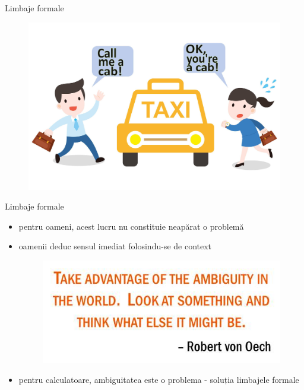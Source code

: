 \documentclass[pdf]{beamer}
\begin{document}
\begin{frame}{Limbaje formale}
\begin{figure}[ht!]
\centering
\includegraphics[scale=0.1]{img/callmeacab.jpg}
\end{figure}
\end{frame}



\begin{frame}{Limbaje formale}
\begin{itemize}
\item
pentru oameni, acest lucru nu constituie neapărat o problemă
\item
oamenii deduc sensul imediat folosindu-se de context
\begin{figure}[ht!]
\centering
\includegraphics[scale=1]{img/Ambiguity-Quote-Image.jpg}
\end{figure}
\item
pentru calculatoare, ambiguitatea este o problema - soluția limbajele formale
\end{itemize}
\end{frame}
\end{document}
